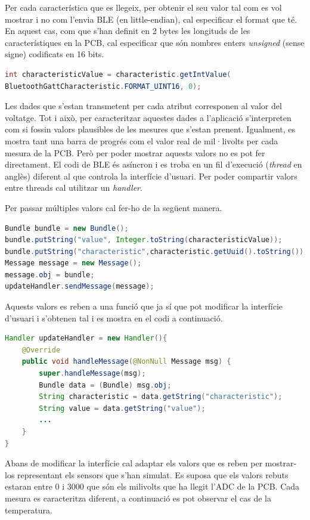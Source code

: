 Per cada característica que es llegeix, per obtenir el seu valor tal com es vol mostrar i no com l'envia BLE (en little-endian), cal especificar el format que té.
En aquest cas, com que s'han definit en 2 bytes les longituds de les característiques en la PCB, cal especificar que són nombres enters \textit{unsigned} (sense signe) codificats en 16 bits.

\begin{lstlisting}[language=java]
int characteristicValue = characteristic.getIntValue(
BluetoothGattCharacteristic.FORMAT_UINT16, 0);
\end{lstlisting}

Les dades que s'estan transmetent per cada atribut corresponen al valor del voltatge.
Tot i això, per caracteritzar aquestes dades a l'aplicació s'interpreten com si fossin valors plausibles de les mesures que s'estan prenent.
Igualment, es mostra tant una barra de progrés com el valor real de mil·livolts per cada mesura de la PCB.
Però per poder mostrar aquests valors no es pot fer directament.
El codi de BLE és asíncron i es troba en un fil d'execució (\textit{thread} en anglès) diferent al que controla la interfície d'usuari.
Per poder compartir valors entre threads cal utilitzar un \textit{handler}.

Per passar múltiples valors cal fer-ho de la següent manera.
\begin{lstlisting}[language=java]
Bundle bundle = new Bundle();
bundle.putString("value", Integer.toString(characteristicValue));
bundle.putString("characteristic",characteristic.getUuid().toString());
Message message = new Message();
message.obj = bundle;
updateHandler.sendMessage(message);
\end{lstlisting}

Aquests valors es reben a una funció que ja sí que pot modificar la interfície d'usuari i s'obtenen tal i es mostra en el codi a continuació.

\begin{lstlisting}[language=java]
 Handler updateHandler = new Handler(){
	@Override
	public void handleMessage(@NonNull Message msg) {
		super.handleMessage(msg);
		Bundle data = (Bundle) msg.obj;
		String characteristic = data.getString("characteristic");
		String value = data.getString("value");
		...
	}
}
\end{lstlisting}

Abans de modificar la interfície cal adaptar els valors que es reben per mostrar-los representant els sensors que s'han simulat.
Es suposa que els valors rebuts estaran entre 0 i 3000 que són els milivolts que ha llegit l'ADC de la PCB.
Cada mesura es caracteritza diferent, a continuació es pot observar el cas de la temperatura.

